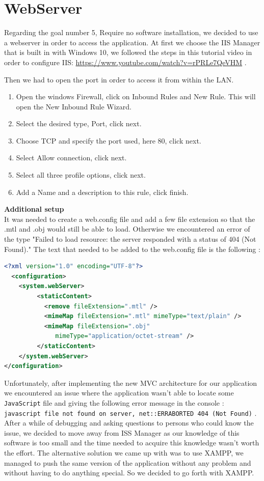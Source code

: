\documentclass{scrbook}
\begin{document}
\section{WebServer \label{webserver}}
Regarding the goal number 5, Require no software installation, we decided to use a webserver in order to access the application. At first we choose the IIS Manager that is built in with Windows 10, 
we followed the steps in this tutorial video in order to configure IIS: \url{https://www.youtube.com/watch?v=rPRLe7QeVHM} .

Then we had to open the port in order to access it from within the LAN.
\begin{enumerate}
  \item Open the windows Firewall, click on Inbound Rules and New Rule. This will open the New Inbound Rule Wizard.
  \item Select the desired type, Port, click next.
  \item Choose TCP and specify the port used, here 80, click next.
  \item Select Allow connection, click next.
  \item Select all three profile options, click next.
  \item Add a Name and a description to this rule, click finish.
\end{enumerate}

\textbf{Additional setup}\\

It was needed to create a web.config file and add a few file extension so that the .mtl and .obj would still be able to load. 
Otherwise we encountered an error of the type "Failed to load resource: the server responded with a status of 404 (Not Found)." 
The text that needed to be added to the web.config file is the following : \\
\begin{lstlisting}[language=XML, basicstyle=\ttfamily\small]
<?xml version="1.0" encoding="UTF-8"?>
  <configuration>
    <system.webServer>
         <staticContent>
           <remove fileExtension=".mtl" />
           <mimeMap fileExtension=".mtl" mimeType="text/plain" />
           <mimeMap fileExtension=".obj" 
              mimeType="application/octet-stream" />
         </staticContent>
    </system.webServer>
</configuration>
\end{lstlisting}

Unfortunately, after implementing the new MVC architecture for our application we encountered an issue where the application wasn't able to locate some \texttt{JavaScript} file and giving the following error message in the console : 
\texttt{javascript file not found on server, net::ERR\textunderscore ABORTED 404 (Not Found)} .  After a while of debugging and asking questions to persons who could know the issue, 
we decided to move away from ISS Manager as our knowledge of this software is too small and the time needed to acquire this knowledge wasn't worth the effort. 
The alternative solution we came up with was to use XAMPP, we managed to push the same version of the application without any problem and without having to do anything special. So we decided to go forth with XAMPP.
\end{document}
